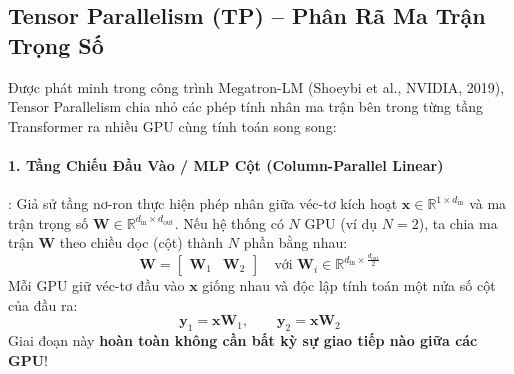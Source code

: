 \subsection{Tensor Parallelism (TP) -- Phân Rã Ma Trận Trọng Số}
Được phát minh trong công trình Megatron-LM (Shoeybi et al., NVIDIA, 2019), Tensor Parallelism chia nhỏ các phép tính nhân ma trận bên trong từng tầng Transformer ra nhiều GPU cùng tính toán song song:

\paragraph{1. Tầng Chiếu Đầu Vào / MLP Cột (Column-Parallel Linear)}:
Giả sử tầng nơ-ron thực hiện phép nhân giữa véc-tơ kích hoạt $\mathbf{x} \in \mathbb{R}^{1 \times d_{\text{in}}}$ và ma trận trọng số $\mathbf{W} \in \mathbb{R}^{d_{\text{in}} \times d_{\text{out}}}$.
Nếu hệ thống có $N$ GPU (ví dụ $N=2$), ta chia ma trận $\mathbf{W}$ theo chiều dọc (cột) thành $N$ phần bằng nhau:
\begin{equation}
\mathbf{W} = \begin{bmatrix} \mathbf{W}_1 & \mathbf{W}_2 \end{bmatrix} \quad \text{với } \mathbf{W}_i \in \mathbb{R}^{d_{\text{in}} \times \frac{d_{\text{out}}}{2}}
\end{equation}
Mỗi GPU giữ véc-tơ đầu vào $\mathbf{x}$ giống nhau và độc lập tính toán một nửa số cột của đầu ra:
\begin{equation}
\mathbf{y}_1 = \mathbf{x} \mathbf{W}_1, \qquad \mathbf{y}_2 = \mathbf{x} \mathbf{W}_2
\end{equation}
Giai đoạn này \textbf{hoàn toàn không cần bất kỳ sự giao tiếp nào giữa các GPU}!

